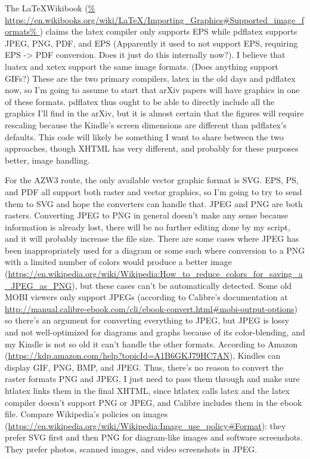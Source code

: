 \documentclass[12pt]{article}
\begin{document}
The \LaTeX Wikibook (\url{%
  https://en.wikibooks.org/wiki/LaTeX/Importing_Graphics#Supported_image_formats%
}) claims the latex compiler only supports EPS while pdflatex supports
JPEG, PNG, PDF, and EPS (Apparently it used to not support EPS,
requiring EPS -> PDF conversion.  Does it just do this internally
now?).  I believe that luatex and xetex support the same image
formats.  (Does anything support GIFs?)  These are the two primary
compilers, latex in the old days and pdflatex now, so I'm going to
assume to start that arXiv papers will have graphics in one of these
formats.  pdflatex thus ought to be able to directly include all the
graphics I'll find in the arXiv, but it is almost certain that the
figures will require rescaling because the Kindle's screen dimensions
are different than pdflatex's defaults.  This code will likely be
something I want to share between the two approaches, though XHTML has
very different, and probably for these purposes better, image
handling.

For the AZW3 route, the only available vector graphic format is SVG.
EPS, PS, and PDF all support both raster and vector graphics, so I'm
going to try to send them to SVG and hope the converters can handle
that.  JPEG and PNG are both rasters.  Converting JPEG to PNG in
general doesn't make any sense because information is already lost,
there will be no further editing done by my script, and it will
probably increase the file size.  There are some cases where JPEG has
been inappropriately used for a diagram or some such where conversion
to a PNG with a limited number of colors would produce a better image
(\url{https://en.wikipedia.org/wiki/Wikipedia:How_to_reduce_colors_for_saving_a_JPEG_as_PNG}),
but these cases can't be automatically detected.  Some old MOBI
viewers only support JPEGs (according to Calibre's documentation at
\url{http://manual.calibre-ebook.com/cli/ebook-convert.html#mobi-output-options})
so there's an argument for converting everything to JPEG, but JPEG is
lossy and not well-optimized for diagrams and graphs because of its
color-blending, and my Kindle is not so old it can't handle the other
formats.  According to Amazon
(\url{https://kdp.amazon.com/help?topicId=A1B6GKJ79HC7AN}), Kindles
can display GIF, PNG, BMP, and JPEG.  Thus, there's no reason to
convert the raster formats PNG and JPEG, I just need to pass them
through and make sure htlatex links them in the final XHTML, since
htlatex calls latex and the latex compiler doesn't support PNG or
JPEG, and Calibre includes them in the ebook file.  Compare
Wikipedia's policies on images
(\url{https://en.wikipedia.org/wiki/Wikipedia:Image_use_policy#Format}):
they prefer SVG first and then PNG for diagram-like images and
software screenshots.  They prefer photos, scanned images, and video
screenshots in JPEG.
\end{document}
